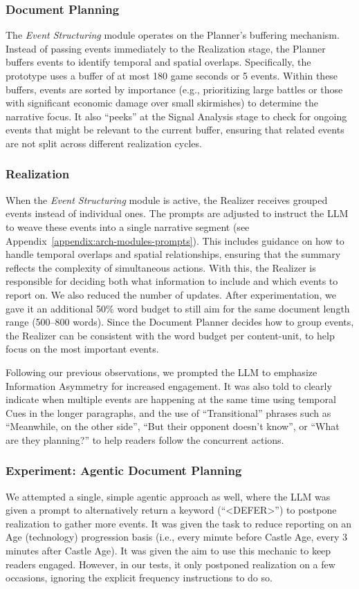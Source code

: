 \subsubsection{Document Planning}
The \textit{Event Structuring} module operates on the Planner's buffering mechanism. Instead of passing events immediately to the Realization stage, the Planner buffers events to identify temporal and spatial overlaps. Specifically, the prototype uses a buffer of at most 180 game seconds or 5 events. Within these buffers, events are sorted by importance (e.g., prioritizing large battles or those with significant economic damage over small skirmishes) to determine the narrative focus. It also ``peeks'' at the Signal Analysis stage to check for ongoing events that might be relevant to the current buffer, ensuring that related events are not split across different realization cycles.

\subsubsection{Realization}
When the \textit{Event Structuring} module is active, the Realizer receives grouped events instead of individual ones. The prompts are adjusted to instruct the LLM to weave these events into a single narrative segment (see Appendix~\ref{appendix:arch-modules-prompts}). This includes guidance on how to handle temporal overlaps and spatial relationships, ensuring that the summary reflects the complexity of simultaneous actions. With this, the Realizer is responsible for deciding both what information to include and which events to report on. We also reduced the number of updates. After experimentation, we gave it an additional 50\% word budget to still aim for the same document length range (500--800 words). Since the Document Planner decides how to group events, the Realizer can be consistent with the word budget per content-unit, to help focus on the most important events.

Following our previous observations, we prompted the LLM to emphasize Information Asymmetry for increased engagement. It was also told to clearly indicate when multiple events are happening at the same time using temporal Cues in the longer paragraphs, and the use of ``Transitional'' phrases such as ``Meanwhile, on the other side'', ``But their opponent doesn't know'', or ``What are they planning?'' to help readers follow the concurrent actions.

\subsubsection{Experiment: Agentic Document Planning}
We attempted a single, simple agentic approach as well, where the LLM was given a prompt to alternatively return a keyword (``<DEFER>'') to postpone realization to gather more events. It was given the task to reduce reporting on an Age (technology) progression basis (i.e., every minute before Castle Age, every 3 minutes after Castle Age). It was given the aim to use this mechanic to keep readers engaged. However, in our tests, it only postponed realization on a few occasions, ignoring the explicit frequency instructions to do so.

